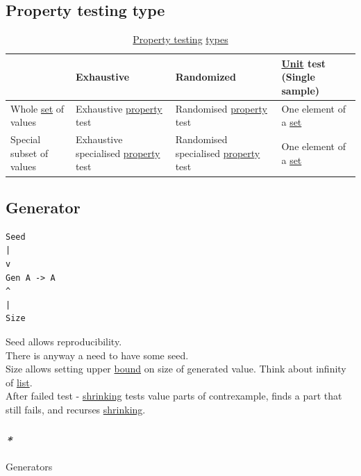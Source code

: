 \documentclass[a4paper,14pt,oneside]{book}
\begin{document}
\subsection{\label{orgc246aae}Property testing type}
\label{sec:org51bf681}

\begin{table}[htbp]
\caption{\label{tab:property-testing-type}\hyperref[org7d55d93]{Property testing} \hyperref[org560d3e8]{types}}
\centering
\begin{tabular}{llll}
\hline
 & Exhaustive & Randomized & \hyperref[orga4edbd5]{Unit} test (Single sample)\\
\hline
Whole \hyperref[org0f7f8fa]{set} of values & Exhaustive \hyperref[orgc713167]{property} test & Randomised \hyperref[orgc713167]{property} test & One element of a \hyperref[org0f7f8fa]{set}\\
Special subset of values & Exhaustive specialised \hyperref[orgc713167]{property} test & Randomised specialised \hyperref[orgc713167]{property} test & One element of a \hyperref[org0f7f8fa]{set}\\
\hline
\end{tabular}
\end{table}

\subsection{\label{orgd344dcd}Generator}
\label{sec:org36c4cc7}
\begin{verbatim}
Seed
|
v
Gen A -> A
^
|
Size
\end{verbatim}

Seed allows reproducibility.\\
There is anyway a need to have some seed.\\
Size allows setting upper \hyperref[org0d1c0d2]{bound} on size of generated value. Think about infinity of \hyperref[org87c8b2a]{list}.\\

After failed test - \hyperref[orgba88c1c]{shrinking} tests value parts of contrexample, finds a part that still fails, and recurses \hyperref[orgba88c1c]{shrinking}.\\

\subsubsection{\emph{*}}
\label{sec:org63d5501}

\label{org2a8be7c}Generators\\
\end{document}
